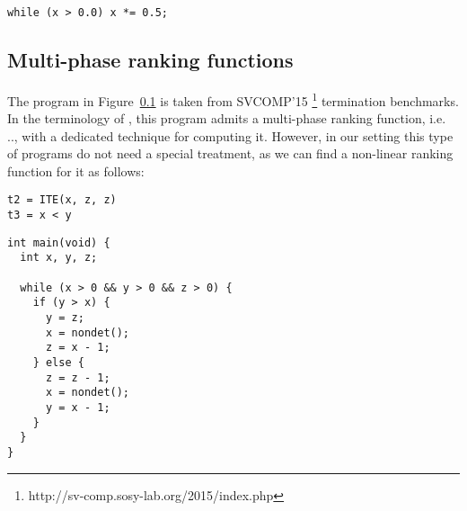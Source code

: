 \documentclass[preprint]{sigplanconf}
\theoremstyle{definition}
\begin{document}
\begin{lstlisting}
while (x > 0.0) x *= 0.5;
\end{lstlisting}


\subsection{Multi-phase ranking functions}
The program in Figure~\ref{} is taken from SVCOMP'15  \footnote{http://sv-comp.sosy-lab.org/2015/index.php} termination benchmarks.
In the terminology of \cite{DBLP:conf/tacas/LeikeH14}, this program admits a multi-phase ranking function, i.e. ..,  with a dedicated technique for computing it. However, in our setting 
this type of programs do not need a special treatment, as we can find a non-linear ranking function for it as follows:
\begin{verbatim}
t2 = ITE(x, z, z)
t3 = x < y
\end{verbatim}







\begin{lstlisting}
int main(void) {
  int x, y, z;

  while (x > 0 && y > 0 && z > 0) {
    if (y > x) {
      y = z;
      x = nondet();
      z = x - 1;
    } else {
      z = z - 1;
      x = nondet();
      y = x - 1;
    }
  }
}
\end{lstlisting}
\end{document}
